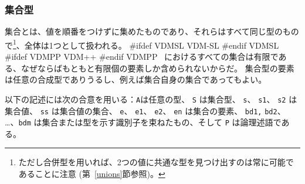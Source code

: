 \documentclass[\pformat,12pt]{jarticle}
\newcommand{\vdmslpp}[2]{%
#ifdef VDMSL
#1
#endif VDMSL
#ifdef VDMPP
#2
#endif VDMPP
}
\newcommand{\vdmsl}{VDM-SL}
\newcommand{\vdmpp}{VDM++}
\begin{document}
\subsubsection{集合型}
\label{sets}

集合とは、値を順番をつけずに集めたものであり、それらはすべて同じ型のもので\footnote{ただし合併型を用いれば、2つの値に共通な型を見つけ出すのは常に可能であることに注意 (第~\ref{unions}節参照)。}、全体は1つとして扱われる。
\vdmslpp{\vdmsl}{\vdmpp}\ におけるすべての集合は有限である、なぜならばもともと有限個の要素しか含められないからだ。 
集合型の要素は任意の合成型でありうるし、例えば集合自身の集合であってもよい。

以下の記述には次の合意を用いる：{\tt A}は任意の型、 {\tt S} は集合型、 {\tt s}、 {\tt s1}、 {\tt s2} は集合値、 {\tt ss} は集合値の集合、 {\tt e}、 {\tt e1}、 {\tt e2}、 {\tt en} は集合の要素、 {\tt bd1,} {\tt bd2}、 \ldots、{\tt bdm} は集合または型を示す識別子を束ねたもの、そして {\tt P} は論理述語である。
\end{document}
